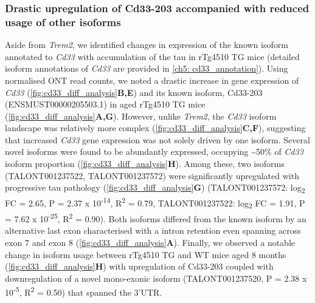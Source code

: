 \subsubsection{Drastic upregulation of Cd33-203 accompanied with reduced usage of other isoforms}
Aside from \textit{Trem2}, we identified changes in expression of the known isoform annotated to \textit{Cd33} with accumulation of the tau in rTg4510 TG mice (detailed isoform annotations of \textit{Cd33} are provided in \cref{ch5: cd33_annotation}). Using normalised ONT read counts, we noted a drastic increase in gene expression of \textit{Cd33} (\cref{fig:cd33_diff_analysis}\textbf{B,E}) and its known isoform, Cd33-203 (ENSMUST00000205503.1) in aged rTg4510 TG mice (\cref{fig:cd33_diff_analysis}\textbf{A,G}). However, unlike \textit{Trem2}, the \textit{Cd33} isoform landscape was relatively more complex (\cref{fig:cd33_diff_analysis}\textbf{C,F}), suggesting that increased \textit{Cd33} gene expression was not solely driven by one isoform. Several novel isoforms were found to be abundantly expressed, occupying \textasciitilde50\% of \textit{Cd33} isoform proportion (\cref{fig:cd33_diff_analysis}\textbf{H}). Among these, two isoforms (TALONT001237522, TALONT001237572) were significantly upregulated with progressive tau pathology (\cref{fig:cd33_diff_analysis}\textbf{G}) (TALONT001237572: log\textsubscript{2} FC = 2.65, P = 2.37 x 10\textsuperscript{-14}, R\textsuperscript{2} = 0.79, TALONT001237522: log\textsubscript{2} FC = 1.91, P = 7.62 x 10\textsuperscript{-25}, R\textsuperscript{2} = 0.90). Both isoforms differed from the known isoform by an alternative last exon characterised with a intron retention even spanning across exon 7 and exon 8 (\cref{fig:cd33_diff_analysis}\textbf{A}). Finally, we observed a notable change in isoform usage between rTg4510 TG and WT mice aged 8 months (\cref{fig:cd33_diff_analysis}\textbf{H}) with upregulation of Cd33-203 coupled with downregulation of a novel mono-exonic isoform (TALONT001237520, P = 2.38 x 10\textsuperscript{-5}, R\textsuperscript{2} = 0.50) that spanned the 3'UTR. 

  
